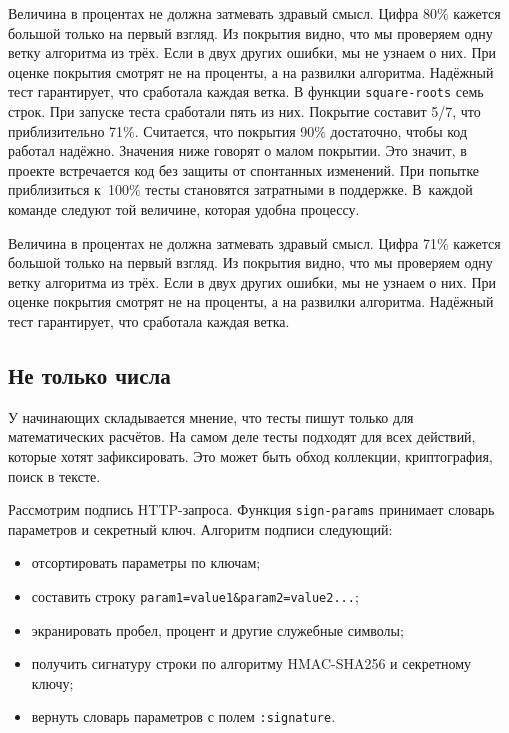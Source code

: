 Величина в процентах не должна затмевать здравый смысл. Цифра 80\% кажется
большой только на первый взгляд. Из покрытия видно, что мы проверяем одну ветку
алгоритма из трёх. Если в двух других ошибки, мы не узнаем о них. При оценке
покрытия смотрят не на проценты, а на развилки алгоритма. Надёжный тест
гарантирует, что сработала каждая ветка.
\else
В функции \verb|square-roots| семь строк. При запуске теста сработали пять из
них. Покрытие составит 5/7, что приблизительно 71\%. Считается, что покрытия
90\% достаточно, чтобы код работал надёжно. Значения ниже говорят о малом
покрытии. Это значит, в проекте встречается код без защиты от спонтанных
изменений. При попытке приблизиться к~100\% тесты становятся затратными в
поддержке. В~каждой команде следуют той величине, которая удобна процессу.

Величина в процентах не должна затмевать здравый смысл. Цифра 71\% кажется
большой только на первый взгляд. Из покрытия видно, что мы проверяем одну ветку
алгоритма из трёх. Если в двух других ошибки, мы не узнаем о них. При оценке
покрытия смотрят не на проценты, а на развилки алгоритма. Надёжный тест
гарантирует, что сработала каждая ветка.
\fi

\subsection{Не только числа}

У начинающих складывается мнение, что тесты пишут только для математических
расчётов. На самом деле тесты подходят для всех действий, которые хотят
зафиксировать. Это может быть обход коллекции, криптография, поиск в тексте.

Рассмотрим подпись HTTP-запроса. Функция \verb|sign-params| принимает словарь
параметров и секретный ключ. Алгоритм подписи следующий:

\begin{itemize}


\item
  отсортировать параметры по ключам;

\item
  составить строку \verb|param1=value1&param2=value2...|;

\item
  экранировать пробел, процент и другие служебные символы;

\item
  получить сигнатуру строки по алгоритму HMAC-SHA256 и секретному ключу;

\item
  вернуть словарь параметров с полем \verb|:signature|.

\end{itemize}

